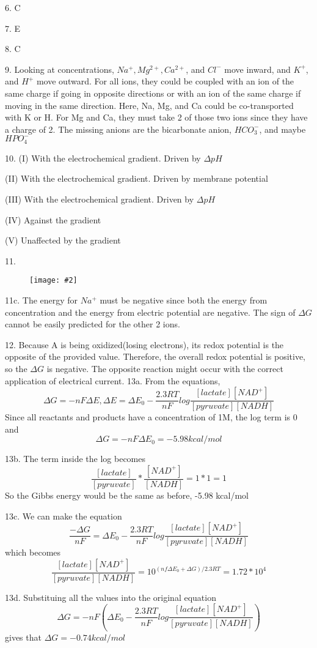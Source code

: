 \documentclass{article}
\newcommand{\makefig}[2]{
\begin{figure}[h]
\centering
\texttt{[image: \#2]}
\end{figure}
}
\begin{document}
6. C

7. E

8. C

9. Looking at concentrations, $Na^+,Mg^{2+},Ca^{2+}$, and $Cl^-$ move inward, and $K^+$, and $H^+$ move outward. For all ions, they could be coupled with an ion of the same charge if going in opposite directions or with an ion of the same charge if moving in the same direction. Here, Na, Mg, and Ca could be co-transported with K or H. For Mg and Ca, they must take 2 of those two ions since they have a charge of 2. The missing anions are the bicarbonate anion, $HCO_3^-$, and maybe $HPO_4^-$

10. (I) With the electrochemical gradient. Driven by $\Delta pH$ 

(II) With the electrochemical gradient. Driven by membrane potential 

(III) With the electrochemical gradient. Driven by $\Delta pH$ 

(IV) Against the gradient

(V) Unaffected by the gradient

11. \makefig{0.5}{P11.png}

11c. The energy for $Na^+$ must be negative since both the energy from concentration and the energy from electric potential are negative. The sign of $\Delta G$ cannot be easily predicted for the other 2 ions.

12. Because A is being oxidized(losing electrons), its redox potential is the opposite of the provided value. Therefore, the overall redox potential is positive, so the $\Delta G$ is negative. The opposite reaction might occur with the correct application of electrical current.
13a. From the equations,
$$\Delta G=-nF\Delta E, \Delta E=\Delta E_0-\frac{2.3RT}{nF}log\frac{[lactate][NAD^+]}{[pyruvate][NADH]}$$
Since all reactants and products have a concentration of 1M, the log term is 0 and
$$\Delta G=-nF\Delta E_0=-5.98 kcal/mol$$

13b. The term inside the log becomes
$$\frac{[lactate]}{[pyruvate]}*\frac{[NAD^+]}{[NADH]}=1*1=1$$
So the Gibbs energy would be the same as before, -5.98 kcal/mol

13c. We can make
the equation
$$\frac{-\Delta G}{nF}=\Delta E_0-\frac{2.3RT}{nF}log\frac{[lactate][NAD^+]}{[pyruvate][NADH]}$$
which becomes
$$\frac{[lactate][NAD^+]}{[pyruvate][NADH]}=10^{(nf\Delta E_0+\Delta G)/2.3RT}=1.72*10^4$$

13d. Substituing all the values into the original equation
$$\Delta G=-nF(\Delta E_0-\frac{2.3RT}{nF}log\frac{[lactate][NAD^+]}{[pyruvate][NADH]})$$
gives that $\Delta G = -0.74 kcal/mol$
\end{document}
